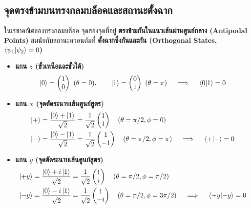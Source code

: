 \subsection{จุดตรงข้ามบนทรงกลมบล็อคและสถานะตั้งฉาก}
ในเรขาคณิตของทรงกลมบล็อค จุดสองจุดที่อยู่ \textbf{ตรงข้ามกันในแนวเส้นผ่านศูนย์กลาง (Antipodal Points)} สมนัยกับสถานะควอนตัมที่ \textbf{ตั้งฉากซึ่งกันและกัน (Orthogonal States, $\braket{\psi_1}{\psi_2} = 0$)}
\begin{itemize}
    \item \textbf{แกน $z$ (ขั้วเหนือและขั้วใต้)}
    \begin{equation}
    \ket{0} = \begin{pmatrix} 1 \\ 0 \end{pmatrix} \ (\theta=0), \qquad \ket{1} = \begin{pmatrix} 0 \\ 1 \end{pmatrix} \ (\theta=\pi) \quad \implies \quad \braket{0}{1} = 0
    \end{equation}
    \item \textbf{แกน $x$ (จุดตัดระนาบเส้นศูนย์สูตร)}
    \begin{align}
    \ket{+} &= \frac{\ket{0}+\ket{1}}{\sqrt{2}} = \frac{1}{\sqrt{2}}\begin{pmatrix} 1 \\ 1 \end{pmatrix} \quad (\theta=\pi/2, \phi=0) \\
    \ket{-} &= \frac{\ket{0}-\ket{1}}{\sqrt{2}} = \frac{1}{\sqrt{2}}\begin{pmatrix} 1 \\ -1 \end{pmatrix} \quad (\theta=\pi/2, \phi=\pi) \quad \implies \quad \braket{+}{-} = 0
    \end{align}
    \item \textbf{แกน $y$ (จุดตัดระนาบเส้นศูนย์สูตร)}
    \begin{align}
    \ket{+y} &= \frac{\ket{0}+i\ket{1}}{\sqrt{2}} = \frac{1}{\sqrt{2}}\begin{pmatrix} 1 \\ i \end{pmatrix} \quad (\theta=\pi/2, \phi=\pi/2) \\
    \ket{-y} &= \frac{\ket{0}-i\ket{1}}{\sqrt{2}} = \frac{1}{\sqrt{2}}\begin{pmatrix} 1 \\ -i \end{pmatrix} \quad (\theta=\pi/2, \phi=3\pi/2) \quad \implies \quad \braket{+y}{-y} = 0
    \end{align}
\end{itemize}

